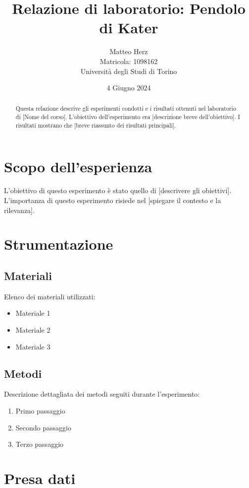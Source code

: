 \documentclass[a4paper,12pt]{article}
\title{Relazione di laboratorio: Pendolo di Kater}
\author{Matteo Herz\\ Matricola: 1098162 \\ Università degli Studi di Torino}
\date{4 Giugno 2024}
\begin{document}
	
	\maketitle
	
	\begin{abstract}
		Questa relazione descrive gli esperimenti condotti e i risultati ottenuti nel laboratorio di [Nome del corso]. L'obiettivo dell'esperimento era [descrizione breve dell'obiettivo]. I risultati mostrano che [breve riassunto dei risultati principali].
	\end{abstract}
	
	\tableofcontents
	
	\section{Scopo dell'esperienza}
	L'obiettivo di questo esperimento è stato quello di [descrivere gli obiettivi]. L'importanza di questo esperimento risiede nel [spiegare il contesto e la rilevanza].
	
	\section{Strumentazione}
	\subsection{Materiali}
	Elenco dei materiali utilizzati:
	\begin{itemize}
		\item Materiale 1
		\item Materiale 2
		\item Materiale 3
	\end{itemize}
	
	\subsection{Metodi}
	Descrizione dettagliata dei metodi seguiti durante l'esperimento:
	\begin{enumerate}
		\item Primo passaggio
		\item Secondo passaggio
		\item Terzo passaggio
	\end{enumerate}
	
	\section{Presa dati}
	
\end{document}
